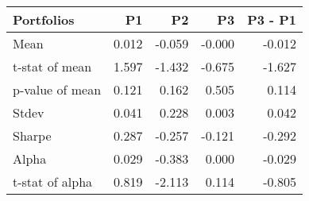 \begin{tabular}{lrrrr}
\toprule
Portfolios & P1 & P2 & P3 & P3 - P1 \\
\midrule
Mean & 0.012 & -0.059 & -0.000 & -0.012 \\
t-stat of mean & 1.597 & -1.432 & -0.675 & -1.627 \\
p-value of mean & 0.121 & 0.162 & 0.505 & 0.114 \\
Stdev & 0.041 & 0.228 & 0.003 & 0.042 \\
Sharpe & 0.287 & -0.257 & -0.121 & -0.292 \\
Alpha & 0.029 & -0.383 & 0.000 & -0.029 \\
t-stat of alpha & 0.819 & -2.113 & 0.114 & -0.805 \\
\bottomrule
\end{tabular}
